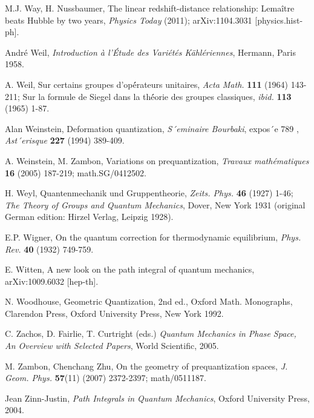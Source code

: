 \begin{thebibliography}{000}
 M.J. Way, H. Nussbaumer, The linear redshift-distance relationship: Lema\^itre
beats Hubble by two years, {\it Physics Today} (2011); arXiv:1104.3031 [physics.hist-ph].

 Andr\'e Weil, {\it Introduction \`a l'\'Etude des Vari\'et\'es K\"ahl\'eriennes},
Hermann, Paris 1958.

 A. Weil, Sur certains groupes d’op\'érateurs unitaires, {\it Acta Math.} {\bf 111}
(1964) 143-211; Sur la formule de Siegel dans la th\'éorie des groupes classiques, {\it ibid.} 
{\bf 113} (1965) 1-87.

 Alan Weinstein, Deformation quantization, {\it S´eminaire Bourbaki}, expos´e 789 , {\it Ast´erisque} {\bf 227} (1994) 389-409.

 A. Weinstein, M. Zambon, Variations on prequantization, {\it
Travaux math\'ematiques} {\bf 16} (2005) 187-219; math.SG/0412502.

 H. Weyl, Quantenmechanik und Gruppentheorie, {\it Zeits. Phys.} {\bf 46} (1927) 1-46; {\it The Theory of Groups and 
Quantum Mechanics}, Dover, New York 1931 (original German edition: Hirzel Verlag, Leipzig 1928).

 E.P. Wigner, On the quantum correction for thermodynamic equilibrium, {\it Phys. Rev.} {\bf 40} (1932) 749-759.

 E. Witten, A new look on the path integral of quantum mechanics, arXiv:1009.6032 [hep-th].

 N. Woodhouse, {Geometric Quantization}, 2nd ed., Oxford Math. Monographs, Clarendon
Press, Oxford University Press, New York 1992.

 C. Zachos, D. Fairlie, T. Curtright (eds.) {\it Quantum Mechanics in Phase Space, An
Overview with Selected Papers}, World Scientific, 2005.

 M. Zambon, Chenchang Zhu, On the geometry of prequantization
spaces, {\it J. Geom. Phys.} {\bf 57}(11) (2007) 2372-2397; math/0511187.

 Jean Zinn-Justin, {\it Path Integrals in Quantum Mechanics}, Oxford University Press, 2004.

\end{thebibliography}

